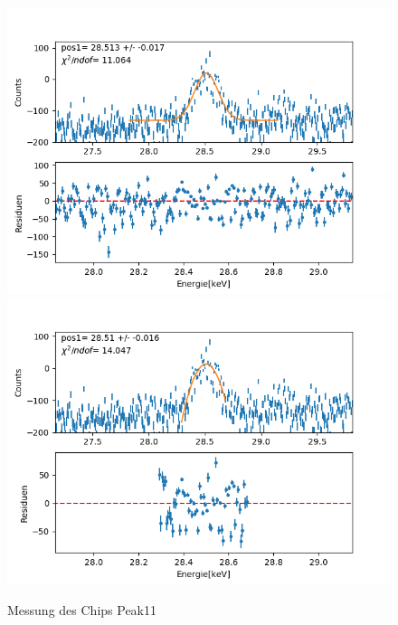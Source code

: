 \documentclass[12pt,a4paper]{article}
\begin{document}
\begin{figure}[H]
\centering
\includegraphics[scale=0.49]{Bilder/roentgen_spektren/chip/chip11_1.png}
\includegraphics[scale=0.49]{Bilder/roentgen_spektren/chip/chip11_2.png}
\caption{Messung des Chips Peak11}
\end{figure}

\newpage
\end{document}
